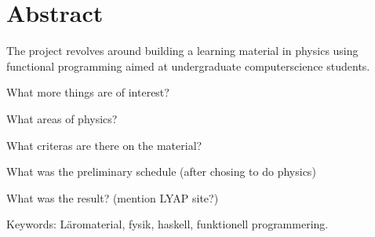 \setlength{\parskip}{0.5cm}

\thispagestyle{plain}			%
\section*{Abstract}

\begin{binge}
The project revolves around building a learning material in physics using functional programming aimed at undergraduate computerscience students. 

What more things are of interest?

    What areas of physics?
    
    What criteras are there on the material?
    
    What was the preliminary schedule (after chosing to do physics)
    
    What was the result? (mention LYAP site?)
 


\vfill
Keywords: Läromaterial, fysik, haskell, funktionell programmering.
\end{binge}

\newpage				%
\thispagestyle{empty}
\mbox{}
